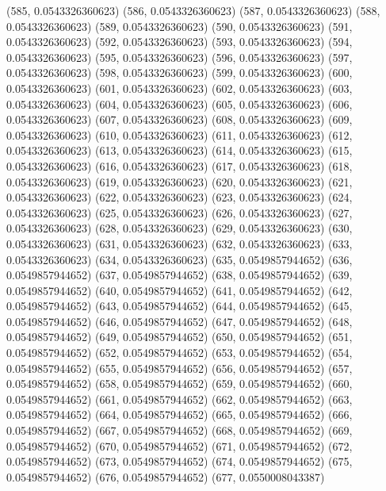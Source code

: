 {					(585, 0.0543326360623)
					(586, 0.0543326360623)
					(587, 0.0543326360623)
					(588, 0.0543326360623)
					(589, 0.0543326360623)
					(590, 0.0543326360623)
					(591, 0.0543326360623)
					(592, 0.0543326360623)
					(593, 0.0543326360623)
					(594, 0.0543326360623)
					(595, 0.0543326360623)
					(596, 0.0543326360623)
					(597, 0.0543326360623)
					(598, 0.0543326360623)
					(599, 0.0543326360623)
					(600, 0.0543326360623)
					(601, 0.0543326360623)
					(602, 0.0543326360623)
					(603, 0.0543326360623)
					(604, 0.0543326360623)
					(605, 0.0543326360623)
					(606, 0.0543326360623)
					(607, 0.0543326360623)
					(608, 0.0543326360623)
					(609, 0.0543326360623)
					(610, 0.0543326360623)
					(611, 0.0543326360623)
					(612, 0.0543326360623)
					(613, 0.0543326360623)
					(614, 0.0543326360623)
					(615, 0.0543326360623)
					(616, 0.0543326360623)
					(617, 0.0543326360623)
					(618, 0.0543326360623)
					(619, 0.0543326360623)
					(620, 0.0543326360623)
					(621, 0.0543326360623)
					(622, 0.0543326360623)
					(623, 0.0543326360623)
					(624, 0.0543326360623)
					(625, 0.0543326360623)
					(626, 0.0543326360623)
					(627, 0.0543326360623)
					(628, 0.0543326360623)
					(629, 0.0543326360623)
					(630, 0.0543326360623)
					(631, 0.0543326360623)
					(632, 0.0543326360623)
					(633, 0.0543326360623)
					(634, 0.0543326360623)
					(635, 0.0549857944652)
					(636, 0.0549857944652)
					(637, 0.0549857944652)
					(638, 0.0549857944652)
					(639, 0.0549857944652)
					(640, 0.0549857944652)
					(641, 0.0549857944652)
					(642, 0.0549857944652)
					(643, 0.0549857944652)
					(644, 0.0549857944652)
					(645, 0.0549857944652)
					(646, 0.0549857944652)
					(647, 0.0549857944652)
					(648, 0.0549857944652)
					(649, 0.0549857944652)
					(650, 0.0549857944652)
					(651, 0.0549857944652)
					(652, 0.0549857944652)
					(653, 0.0549857944652)
					(654, 0.0549857944652)
					(655, 0.0549857944652)
					(656, 0.0549857944652)
					(657, 0.0549857944652)
					(658, 0.0549857944652)
					(659, 0.0549857944652)
					(660, 0.0549857944652)
					(661, 0.0549857944652)
					(662, 0.0549857944652)
					(663, 0.0549857944652)
					(664, 0.0549857944652)
					(665, 0.0549857944652)
					(666, 0.0549857944652)
					(667, 0.0549857944652)
					(668, 0.0549857944652)
					(669, 0.0549857944652)
					(670, 0.0549857944652)
					(671, 0.0549857944652)
					(672, 0.0549857944652)
					(673, 0.0549857944652)
					(674, 0.0549857944652)
					(675, 0.0549857944652)
					(676, 0.0549857944652)
					(677, 0.0550008043387)
}
